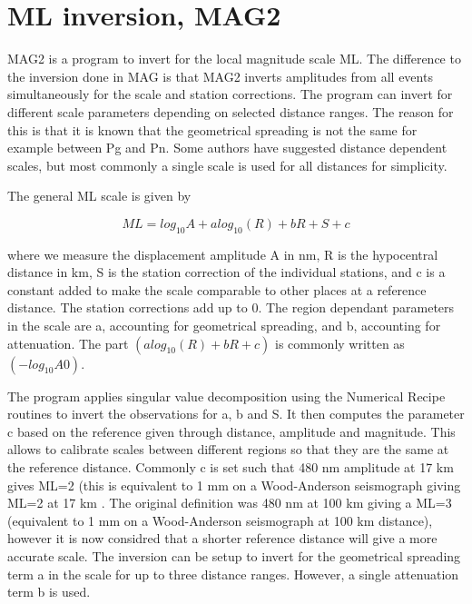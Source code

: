 %
\section{ML inversion, MAG2}
\label{MAG2}

MAG2 is a program to invert for the local magnitude scale ML. 
The difference to the inversion done in MAG is that MAG2 inverts 
amplitudes from all events simultaneously for the scale and 
station corrections. The program can invert for different scale 
parameters depending on selected distance ranges. The reason for 
this is that it is known that the geometrical spreading is not 
the same for example between Pg and Pn. Some authors have suggested 
distance dependent scales, but most commonly a single scale is used 
for all distances for simplicity.

The general ML scale is given by 

\begin{displaymath}
ML = log_{10} A + a log_{10}(R) + b R + S + c
\end{displaymath}

where we measure the displacement amplitude A in nm, R is the hypocentral 
distance in km, S is the station correction of the individual stations, 
and c is a constant added to make the scale comparable to other places at a 
reference distance. The station corrections add up to 0. The region 
dependant parameters in the scale are a, accounting for geometrical 
spreading, and b, accounting for attenuation. The part 
$(a log_{10}(R) + b R + c)$ is commonly written as $(-log_{10} A0)$. 

The program applies singular value decomposition using 
the Numerical Recipe \citep{press2003} routines to invert 
the observations for a, b and S. It then computes the parameter 
c based on the reference given through distance, amplitude and 
magnitude. This allows to calibrate scales between different 
regions so that they are the same at the reference distance. 
Commonly c is set such that 480 nm amplitude at 17 km gives ML=2 
(this is equivalent to 1 mm on a Wood-Anderson seismograph 
giving ML=2 at 17 km \citep{hutton1987}. The original definition was 480 nm at 100 km giving a ML=3 (equivalent to 1 mm on a Wood-Anderson seismograph at 100 km distance), however it is now considred that a shorter reference distance will give a more accurate scale. The inversion 
can be setup to invert for the geometrical spreading  term a 
in the scale for up to three distance ranges. However, a single 
attenuation term b is used.

